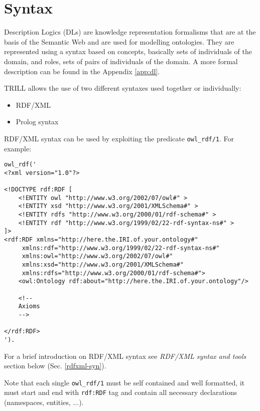 \section{Syntax}
\label{syn}

Description Logics (DLs) are knowledge representation formalisms that are at the basis of the Semantic Web \cite{DBLP:conf/dlog/2003handbook,dlchap} and are used for modelling ontologies.
They are represented using a syntax based on concepts, basically sets of individuals of the domain, and roles, sets of pairs of individuals
of the domain. A more formal description can be found in the Appendix \ref{app:dl}.

TRILL allows the use of two different syntaxes used together or individually:
\begin{itemize}
 \item RDF/XML
 \item Prolog syntax 
\end{itemize}

RDF/XML syntax can be used by exploiting the predicate \verb|owl_rdf/1|. For example:
\begin{small}
\begin{verbatim}
owl_rdf('
<?xml version="1.0"?>

<!DOCTYPE rdf:RDF [
    <!ENTITY owl "http://www.w3.org/2002/07/owl#" >
    <!ENTITY xsd "http://www.w3.org/2001/XMLSchema#" >
    <!ENTITY rdfs "http://www.w3.org/2000/01/rdf-schema#" >
    <!ENTITY rdf "http://www.w3.org/1999/02/22-rdf-syntax-ns#" >
]>
<rdf:RDF xmlns="http://here.the.IRI.of.your.ontology#"
     xmlns:rdf="http://www.w3.org/1999/02/22-rdf-syntax-ns#"
     xmlns:owl="http://www.w3.org/2002/07/owl#"
     xmlns:xsd="http://www.w3.org/2001/XMLSchema#"
     xmlns:rdfs="http://www.w3.org/2000/01/rdf-schema#">
    <owl:Ontology rdf:about="http://here.the.IRI.of.your.ontology"/>

    <!-- 
    Axioms
    -->

</rdf:RDF>
').
\end{verbatim}
\end{small}

For a brief introduction on RDF/XML syntax see \textit{RDF/XML syntax and tools} section below (Sec. \ref{rdfxml-syn}).

Note that each single \verb|owl_rdf/1| must be self contained and well formatted, it must start and end with \verb|rdf:RDF| tag and contain all necessary declarations (namespaces, entities, ...).


